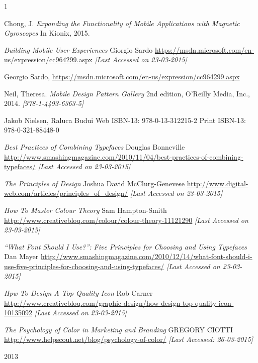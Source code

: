1\begin{thebibliography}{9}

  Chong, J. 
  \textit{Expanding the Functionality of Mobile Applications with Magnetic Gyroscopes} 
  In Kionix,
  2015.
  
	\textit{Building Mobile User Experiences}
	Giorgio Sardo
	\url{https://msdn.microsoft.com/en-us/expression/cc964299.aspx}
	\textit{[Last Accessed on 23-03-2015]}
	
  Georgio Sardo,
  \url{https://msdn.microsoft.com/en-us/expression/cc964299.aspx}
  

	Neil, Theresa.
	\textit{Mobile Design Pattern Gallery}
	2nd edition,
	O'Reilly Media, Inc.,
	2014.
	\textit{[978-1-4493-6363-5]}
		
	Jakob Nielsen, Raluca Budui
	Web ISBN-13: 978-0-13-312215-2
	Print ISBN-13: 978-0-321-88448-0
	
	\textit{Best Practices of Combining Typefaces}
	Douglas Bonneville
	\url{http://www.smashingmagazine.com/2010/11/04/best-practices-of-combining-typefaces/}
	\textit{[Last Accessed on 23-03-2015]}
	
	\textit{The Principles of Design}
	Joshua David McClurg-Genevese
	\url{http://www.digital-web.com/articles/principles_of_design/}
	\textit{[Last Accessed on 23-03-2015]}
	
	\textit{How To Master Colour Theory}
	Sam Hampton-Smith
	\url{http://www.creativebloq.com/colour/colour-theory-11121290}
	\textit{[Last Accessed on 23-03-2015]}
	
	\textit{“What Font Should I Use?”: Five Principles for Choosing and Using Typefaces}
	Dan Mayer
	\url{http://www.smashingmagazine.com/2010/12/14/what-font-should-i-use-five-principles-for-choosing-and-using-typefaces/}
	\textit{[Last Accessed on 23-03-2015]}
	
	\textit{Hpw To Design A Top Quality Icon}
	Rob Carner
	\url{http://www.creativebloq.com/graphic-design/how-design-top-quality-icon-10135092}
	\textit{[Last Accessed on 23-03-2015]}
	
	\textit{The Psychology of Color in Marketing and Branding}
	GREGORY CIOTTI
	\url{http://www.helpscout.net/blog/psychology-of-color/}
	\textit{[Last Accessed: 26-03-2015]}
		
	
\end{thebibliography}2013